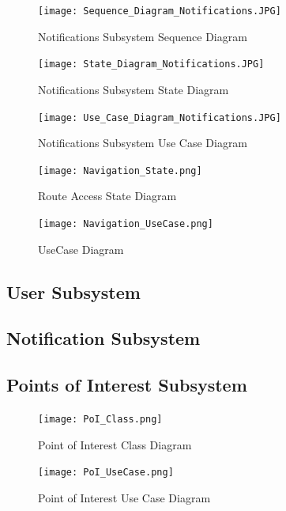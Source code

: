 \documentclass{article}
\begin{document}
				\begin{figure}[h!]
					\texttt{[image: Sequence\_Diagram\_Notifications.JPG]}
					\caption{Notifications Subsystem Sequence Diagram}	
				\end{figure}
				
				\begin{figure}[h!]
					\texttt{[image: State\_Diagram\_Notifications.JPG]}
					\caption{Notifications Subsystem State Diagram}	
				\end{figure}
				
				\begin{figure}[h!]
					\texttt{[image: Use\_Case\_Diagram\_Notifications.JPG]}
					\caption{Notifications Subsystem Use Case Diagram}	
				\end{figure}
				
				\begin{figure}[H]
                     \texttt{[image: Navigation\_State.png]}
                     \caption{Route Access State Diagram}
					 \label{fig:navigation_state}
			    \end{figure}
			    
			    \begin{figure}[H]
                     \texttt{[image: Navigation\_UseCase.png]}
                     \caption{UseCase Diagram}
					 \label{fig:navigation_UseCase}
			    \end{figure}

			    
			\subsection{User Subsystem}\label{subsec:users}
			\subsection{Notification Subsystem}\label{subsec:notification}

			\newpage
			\subsection{Points of Interest Subsystem}\label{subsec:points of interest}
				\begin{figure}[H]
		 \texttt{[image: PoI\_Class.png]}
                     \caption{Point of Interest Class Diagram}
					 \label{fig:PoI_class}
			    \end{figure}

			\begin{figure}[H]
		 \texttt{[image: PoI\_UseCase.png]}
                     \caption{Point of Interest Use Case Diagram}
					 \label{fig:PoI_UseCase}
			    \end{figure}
\end{document}
